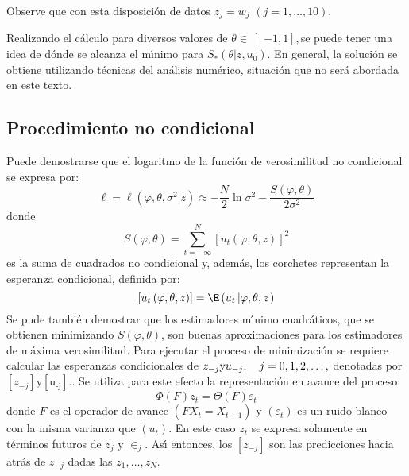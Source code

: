 \begin{ejemplo}
Observe que con esta disposici\'{o}n de datos $z_{j} =w_{j}$ $\left( 
{j=1,\ldots ,10} \right).$

Realizando el c\'{a}lculo para diversos valores de $\theta \in \left] 
{-1,1} \right],$se puede tener una idea de d\'{o}nde se alcanza el 
m\'{\i}nimo para $S_{\ast } \left( {\theta \left| {z,u_{0} } \right.} 
\right).$ En general, la soluci\'{o}n se obtiene utilizando t\'{e}cnicas del 
an\'{a}lisis num\'{e}rico, situaci\'{o}n que no ser\'{a} abordada en este 
texto.


\end{ejemplo}



\subsection{Procedimiento no condicional}

Puede demostrarse que el logaritmo de la funci\'{o}n de verosimilitud no 
condicional se expresa por:
\[
\ell =\ell \left( {\varphi ,\theta ,\sigma^{2}\left| z \right.} 
\right)\approx -\frac{N}{2}\ln \sigma^{2}-\frac{S\left( {\varphi ,\theta 
} \right)}{2\sigma^{2}}
\]
donde
\[
S\left( {\varphi ,\theta } \right)=\sum_{t=-\infty }^N {\left[ 
{u_{t} \left( {\varphi ,\theta ,z} \right)} \right]^{2}} 
\]
es la suma de cuadrados no condicional y, adem\'{a}s, los corchetes 
representan la esperanza condicional, definida por:
\[
\left[ {u_{t} \left( {\varphi ,\theta ,z} \right)} \right]=\E\left( 
{u_{t} \left| {\varphi ,\theta ,z} \right.} \right)
\]
Se pude tambi\'{e}n demostrar que los estimadores m\'{\i}nimo 
cuadr\'{a}ticos, que se obtienen minimizando $S\left( {\varphi ,\theta } 
\right)$, son buenas aproximaciones para los estimadores de m\'{a}xima 
verosimilitud. Para ejecutar el proceso de minimizaci\'{o}n se requiere 
calcular las esperanzas condicionales de $z_{-j} \text{y}u_{-j} ,\quad 
j=0,1,2,\mathellipsis ,$ denotadas por $\left[ {z_{-j} } 
\right]\text{y}\left[ {\text{u}_{\text{-j}} } \right].$. Se utiliza para 
este efecto la representaci\'{o}n en avance del proceso:
\[
\Phi \left( F \right)z_{t} =\Theta \left( F \right)\varepsilon_{t} 
\]
donde $F$ es el operador de avance $\left( {FX_{t} =X_{t+1} } 
\right)$ y $\left( {\varepsilon_{t} } \right)$ es un ruido blanco 
con la misma varianza que $\left( {u_{t} } \right).$ En este caso $z_{t} $ 
se expresa solamente en t\'{e}rminos futuros de $z_{j}$ y $\in_{j} 
$. As\'{\i} entonces, los $\left[ {z_{-j} } \right]$ son las predicciones 
hacia atr\'{a}s de $z_{-j} $ dadas las $z_{1} ,\ldots ,z_{N} .$

